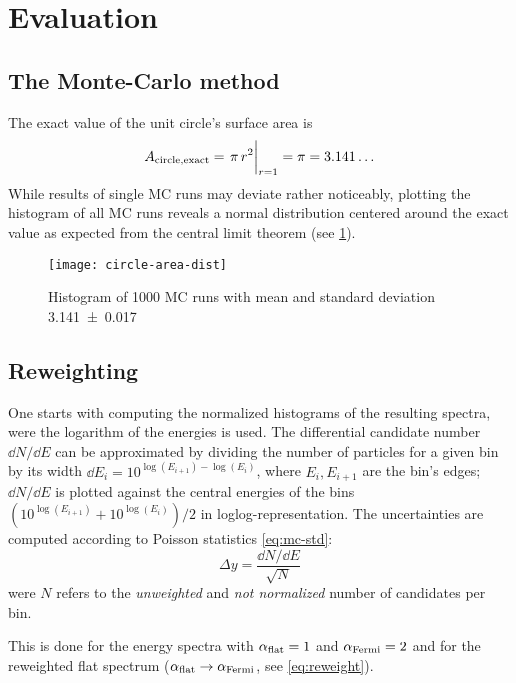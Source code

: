 \section{Evaluation}
\subsection{The Monte-Carlo method}
\label{sec:eval-circle}
The exact value of the unit circle's surface area is
\begin{equation}
    A_{\mathrm{circle,exact}}=\eval{\pi\,r^2}_{r=1}=\pi=3.141\dotso
    \label{eq:circle-area-exact}
\end{equation}
While results of single MC runs may deviate rather noticeably,
plotting the histogram of all MC runs reveals a normal distribution
centered around the exact value as expected from the central
limit theorem (see \cref{fig:circle-area-hist}).

\begin{figure}[ht]
    \centering
    \texttt{[image: circle-area-dist]}
    \caption{Histogram of \num{1000} MC runs with mean and standard
    deviation \num{3.141(17)}}
    \label{fig:circle-area-hist}
\end{figure}

\subsection{Reweighting}
\label{sec:eval-rew}
One starts with computing the normalized histograms of the resulting spectra,
were the logarithm of the energies is used. The differential candidate number
$\dd{N}/\dd{E}$ can be approximated by dividing the number of particles for a
given bin by its width $\dd{E_i}=10^{\log(E_{i+1})-\log(E_{i})}$, where $E_{i},
E_{i+1}$ are the bin's edges; $\dd{N}/\dd{E}$ is plotted against the central
energies of the bins $\left(10^{\log(E_{i+1})}+10^{\log(E_{i})}\right)/2$ in
loglog-representation. The uncertainties are computed according to Poisson
statistics \cref{eq:mc-std}:
\begin{equation*}
    \Delta{y}=\frac{\dd{N}/\dd{E}}{\sqrt{N}}
\end{equation*}
were $N$ refers to the \emph{unweighted} and \emph{not normalized} number of
candidates per bin.

This is done for the energy spectra with $\alpha_{\mathrm{flat}}=1$ and
$\alpha_{\mathrm{Fermi}}=2$ and for the reweighted flat spectrum
($\alpha_{\mathrm{flat}}\to\alpha_{\mathrm{Fermi}}$, see \cref{eq:reweight}).


